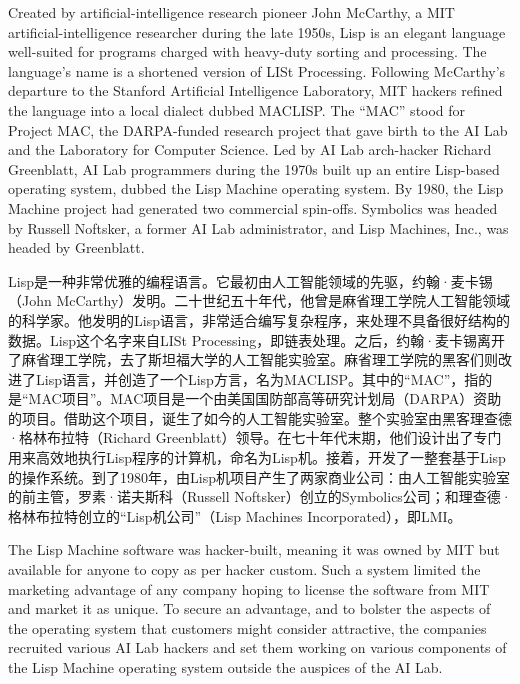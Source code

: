 \ifdefined\vone
\ifdefined\eng
Created by artificial-intelligence research pioneer John McCarthy, a MIT artificial-intelligence researcher during the late 1950s, Lisp is an elegant language well-suited for programs charged with heavy-duty sorting and processing. The language's name is a shortened version of LISt Processing. Following McCarthy's departure to the Stanford Artificial Intelligence Laboratory, MIT hackers refined the language into a local dialect dubbed MACLISP. The ``MAC'' stood for Project MAC, the DARPA-funded research project that gave birth to the AI Lab and the Laboratory for Computer Science. Led by AI Lab arch-hacker Richard Greenblatt, AI Lab programmers during the 1970s built up an entire Lisp-based operating system, dubbed the Lisp Machine operating system. By 1980, the Lisp Machine project had generated two commercial spin-offs. Symbolics was headed by Russell Noftsker, a former AI Lab administrator, and Lisp Machines, Inc., was headed by Greenblatt.
\fi

\ifdefined\chs
Lisp是一种非常优雅的编程语言。它最初由人工智能领域的先驱，约翰·麦卡锡（John McCarthy）发明。二十世纪五十年代，他曾是麻省理工学院人工智能领域的科学家。他发明的Lisp语言，非常适合编写复杂程序，来处理不具备很好结构的数据。Lisp这个名字来自LISt Processing，即链表处理。之后，约翰·麦卡锡离开了麻省理工学院，去了斯坦福大学的人工智能实验室。麻省理工学院的黑客们则改进了Lisp语言，并创造了一个Lisp方言，名为MACLISP。其中的``MAC''，指的是``MAC项目''。MAC项目是一个由美国国防部高等研究计划局（DARPA）资助的项目。借助这个项目，诞生了如今的人工智能实验室。整个实验室由黑客理查德·格林布拉特（Richard Greenblatt）领导。在七十年代末期，他们设计出了专门用来高效地执行Lisp程序的计算机，命名为Lisp机。接着，开发了一整套基于Lisp的操作系统。到了1980年，由Lisp机项目产生了两家商业公司：由人工智能实验室的前主管，罗素·诺夫斯科（Russell Noftsker）创立的Symbolics公司；和理查德·格林布拉特创立的``Lisp机公司''（Lisp Machines Incorporated），即LMI。
\fi

\ifdefined\eng
The Lisp Machine software was hacker-built, meaning it was owned by MIT but available for anyone to copy as per hacker custom. Such a system limited the marketing advantage of any company hoping to license the software from MIT and market it as unique. To secure an advantage, and to bolster the aspects of the operating system that customers might consider attractive, the companies recruited various AI Lab hackers and set them working on various components of the Lisp Machine operating system outside the auspices of the AI Lab.
\fi

